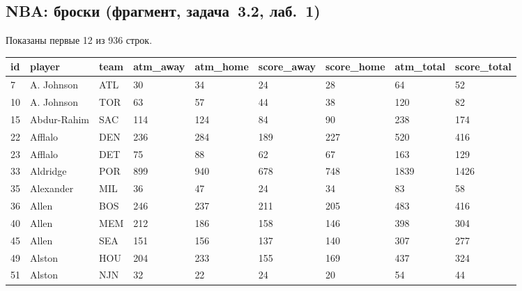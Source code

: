 \subsection{NBA: броски (фрагмент, задача~3.2, лаб.~1)}
\label{app:data-nba}
Показаны первые 12 из 936 строк.
\begin{center}
\footnotesize
\begin{tabular}{@{}lllllllll@{}}
 \toprule
\textbf{id} & \textbf{player} & \textbf{team} & \textbf{atm\_away} & \textbf{atm\_home} & \textbf{score\_away} & \textbf{score\_home} & \textbf{atm\_total} & \textbf{score\_total} \\
 \midrule
7 & A. Johnson & ATL & 30 & 34 & 24 & 28 & 64 & 52 \\
10 & A. Johnson & TOR & 63 & 57 & 44 & 38 & 120 & 82 \\
15 & Abdur-Rahim & SAC & 114 & 124 & 84 & 90 & 238 & 174 \\
22 & Afflalo & DEN & 236 & 284 & 189 & 227 & 520 & 416 \\
23 & Afflalo & DET & 75 & 88 & 62 & 67 & 163 & 129 \\
33 & Aldridge & POR & 899 & 940 & 678 & 748 & 1839 & 1426 \\
35 & Alexander & MIL & 36 & 47 & 24 & 34 & 83 & 58 \\
36 & Allen & BOS & 246 & 237 & 211 & 205 & 483 & 416 \\
40 & Allen & MEM & 212 & 186 & 158 & 146 & 398 & 304 \\
45 & Allen & SEA & 151 & 156 & 137 & 140 & 307 & 277 \\
49 & Alston & HOU & 204 & 233 & 155 & 169 & 437 & 324 \\
51 & Alston & NJN & 32 & 22 & 24 & 20 & 54 & 44 \\
 \bottomrule
\end{tabular}
\end{center}

